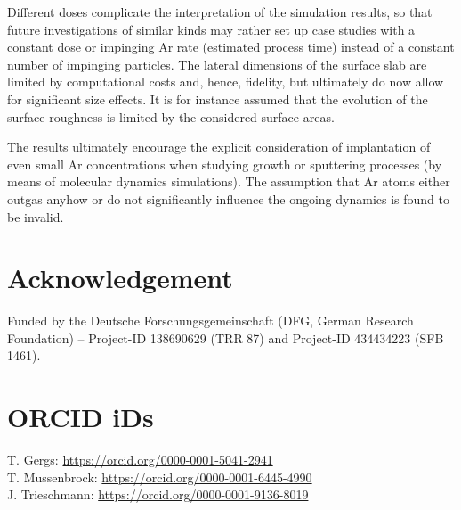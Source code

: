 \documentclass[12pt,a4paper,preprint,superscriptaddress]{revtex4-1}
\begin{document}
Different doses complicate the interpretation of the simulation results, so that future investigations of similar kinds may rather set up case studies with a constant dose or impinging Ar rate (estimated process time) instead of a constant number of impinging particles. The lateral dimensions of the surface slab are limited by computational costs and, hence, fidelity, but ultimately do now allow for significant size effects. It is for instance assumed that the evolution of the surface roughness is limited by the considered surface areas. 

The results ultimately encourage the explicit consideration of implantation of even small Ar concentrations when studying growth or sputtering processes (by means of molecular dynamics simulations). The assumption that Ar atoms either outgas anyhow or do not significantly influence the ongoing dynamics is found to be invalid. 

\section*{Acknowledgement}

Funded by the Deutsche Forschungsgemeinschaft (DFG, German Research Foundation) – Project-ID 138690629 (TRR 87) and Project-ID 434434223 (SFB 1461).

\section*{ORCID iDs}
\noindent
T. Gergs: \url{https://orcid.org/0000-0001-5041-2941}\\
T. Mussenbrock: \url{https://orcid.org/0000-0001-6445-4990} \\
J. Trieschmann: \url{https://orcid.org/0000-0001-9136-8019}



\end{document}
